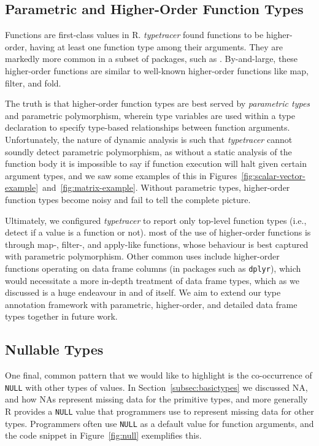 \documentclass[acmsmall,review,anonymous]{acmart}\settopmatter{printfolios=true,printccs=false,printacmref=false}
\newcommand{\code}[1]{{\lstinline[style=Rin]!#1!}\xspace}
\newcommand{\typetracer}{\emph{typetracer}\xspace} %
\begin{document}
%
%
%
%
\subsection{Parametric and Higher-Order Function Types}


Functions are first-class values in R.
\typetracer found  functions to be higher-order, having at least one function type among their arguments.
They are markedly more common in a subset of packages, such as .
By-and-large, these higher-order functions are similar to well-known higher-order functions like map, filter, and fold.

The truth is that higher-order function types are best served by {\it parametric types} and parametric polymorphism, wherein type variables are used within a type declaration to specify type-based relationships between function arguments.
Unfortunately, the nature of dynamic analysis is such that \typetracer cannot soundly detect parametric polymorphism, as without a static analysis of the function body it is impossible to say if function execution will halt given certain argument types, and we saw some examples of this in Figures~\ref{fig:scalar-vector-example}~and~\ref{fig:matrix-example}.
Without parametric types, higher-order function types become noisy and fail to tell the complete picture.

Ultimately, we configured \typetracer to report only top-level function types (i.e., detect if a value is a function or not).
 most of the use of higher-order functions is through map-, filter-, and apply-like functions, whose behaviour is best captured with parametric polymorphism.
Other common uses include higher-order functions operating on data frame columns (in packages such as \code{dplyr}), which would necessitate a more in-depth treatment of data frame types, which as we discussed is a huge endeavour in and of itself.
We aim to extend our type annotation framework with parametric, higher-order, and detailed data frame types together in future work.


%
%
%
%
\subsection{Nullable Types}

One final, common pattern that we would like to highlight is the co-occurrence of \code{NULL} with other types of values.
In Section~\ref{subsec:basictypes} we discussed NA, and how NAs represent missing data for the primitive types, and more generally R provides a \code{NULL} value that programmers use to represent missing data for other types.
Programmers often use \code{NULL} as a default value for function arguments, and the code snippet in Figure~\ref{fig:null} exemplifies this.
\end{document}
